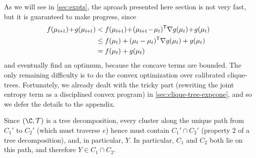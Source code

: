 As we will see in \cref{sec:expts}, the aproach presented here section is 
not very fast, but it is guaranteed to make progress, since
\def\tplus1{{t\mskip-2mu+\mskip-2mu1}}
\begin{align*}
    f(\mu_\tplus1) \!+\! g(\mu_\tplus1) &<  f(\mu_\tplus1) \!+\! (\mu_\tplus1 \!-\! \mu_t)^{\sf T} \nabla g(\mu_t) \!+\! g(\mu_t)
        \\
    &\le  f(\mu_t) + (\mu_t - \mu_{t})^{\sf T}\nabla g(\mu_t)  + g(\mu_t)
        \\
    &= f(\mu_t) + g(\mu_t)
\end{align*}
and eventually find an optimum, because the concave terms are bounded.
%
%
The only remaining difficulty is to do the convex optimization over
calibrated clique-trees. Fortunately, we already dealt with the 
tricky part (rewriting the joint entropy term as a disciplined convex program) in 
\cref{sec:clique-tree-expcone},
and so we defer the details to the appendix.
    
    

    

Since $(\C, \cal T)$ is a tree decomposition, every cluster along the unique path from $C_1'$ to $C_2'$ (which must traverse $e$) hence must contain $C_1' \cap C_2'$ (property 2 of a tree decomposition), and, in particular, $Y$.  In particular, $C_1$ and $C_2$ both lie on this path, and therefore $Y \in C_1 \cap C_2$.


